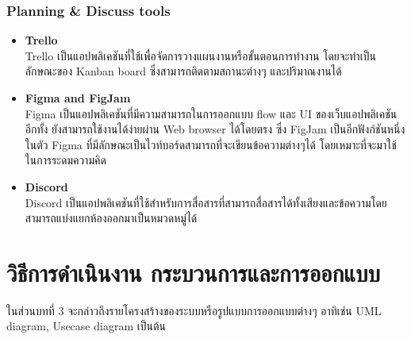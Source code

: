 \documentclass[12pt,oneside,openright,a4paper]{cpe-thai-project}
\begin{document}
\subsection{Planning \& Discuss tools}
\begin{itemize}
\item \textbf{Trello} \\
\hspace*{1cm} Trello เป็นแอปพลิเคชันที่ใช้เพื่อจัดการวางแผนงานหรือขั้นตอนการทำงาน โดยจะทำเป็นลักษณะของ Kanban board ซึ่งสามารถติดตามสถานะต่างๆ และปริมาณงานได้ \cite{WhatIsTrello}
\item \textbf{Figma and FigJam} \\
\hspace*{1cm} Figma เป็นแอปพลิเคชันที่มีความสามารถในการออกแบบ flow และ UI ของเว็บแอปพลิเคชันอีกทั้ง ยังสามารถใช้งานได้ง่ายผ่าน Web browser ได้โดยตรง ซึ่ง FigJam เป็นอีกฟังก์ชันหนึ่งในตัว Figma ที่มีลักษณะเป็นไวท์บอร์ดสามารถที่จะเขียนข้อความต่างๆได้ โดยเหมาะที่จะมาใช้ในการระดมความคิด \cite{WhatIsFigma}
\item \textbf{Discord} \\
\hspace*{1cm} Discord เป็นแอปพลิเคชันที่ใช้สำหรับการสื่อสารที่สามารถสื่อสารได้ทั้งเสียงและข้อความโดยสามารถแบ่งแยกห้องออกมาเป็นหมวดหมู่ได้ \cite{WhatIsDiscord}
\end{itemize}



\chapter{วิธีการดำเนินงาน กระบวนการและการออกแบบ}

ในส่วนบทที่ 3 จะกล่าวถึงรายโครงสร้างของระบบหรือรูปแบบการออกแบบต่างๆ อาทิเช่น UML diagram, Usecase diagram เป็นต้น
\end{document}
